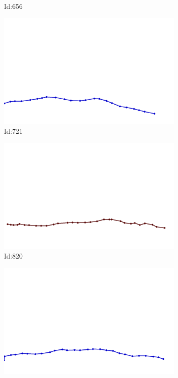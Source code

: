 \documentclass[12pt,twoside]{report}
\begin{document}
\begin{figure}
\begin{subfigure}[b]{0.20\textwidth}
\caption{Id:656}
\end{subfigure}
\begin{subfigure}[b]{0.20\textwidth}
\centering
\includegraphics[width=\textwidth]{../../trajectories/721.png}
\caption{Id:721}
\end{subfigure}
\begin{subfigure}[b]{0.20\textwidth}
\centering
\includegraphics[width=\textwidth]{../../trajectories/820.png}
\caption{Id:820}
\end{subfigure}
\begin{subfigure}[b]{0.20\textwidth}
\centering
\includegraphics[width=\textwidth]{../../trajectories/882.png}

\end{subfigure}
\end{figure}
\end{document}
